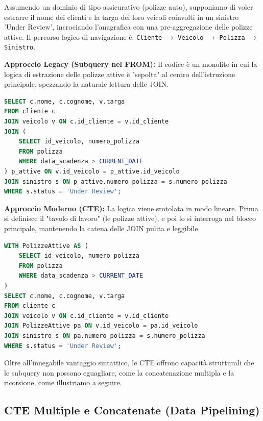 \begin{example}
Assumendo un dominio di tipo assicurativo (polizze auto), supponiamo di voler estrarre il nome dei clienti e la targa dei loro veicoli coinvolti in un sinistro 'Under Review', incrociando l'anagrafica con una pre-aggregazione delle polizze attive.
Il percorso logico di navigazione è: \texttt{Cliente} $\rightarrow$ \texttt{Veicolo} $\rightarrow$ \texttt{Polizza} $\rightarrow$ \texttt{Sinistro}.

\textbf{Approccio Legacy (Subquery nel FROM):}
Il codice è un monolite in cui la logica di estrazione delle polizze attive è "sepolta" al centro dell'istruzione principale, spezzando la naturale lettura delle JOIN.
\begin{lstlisting}[language=SQL, basicstyle=\ttfamily\small, keywordstyle=\color{blue}\bfseries]
SELECT c.nome, c.cognome, v.targa
FROM cliente c
JOIN veicolo v ON c.id_cliente = v.id_cliente
JOIN (
    SELECT id_veicolo, numero_polizza
    FROM polizza
    WHERE data_scadenza > CURRENT_DATE
) p_attive ON v.id_veicolo = p_attive.id_veicolo
JOIN sinistro s ON p_attive.numero_polizza = s.numero_polizza
WHERE s.status = 'Under Review';
\end{lstlisting}

\textbf{Approccio Moderno (CTE):}
La logica viene srotolata in modo lineare. Prima si definisce il "tavolo di lavoro" (le polizze attive), e poi lo si interroga nel blocco principale, mantenendo la catena delle JOIN pulita e leggibile.
\begin{lstlisting}[language=SQL, basicstyle=\ttfamily\small, keywordstyle=\color{blue}\bfseries]
WITH PolizzeAttive AS (
    SELECT id_veicolo, numero_polizza
    FROM polizza
    WHERE data_scadenza > CURRENT_DATE
)
SELECT c.nome, c.cognome, v.targa
FROM cliente c
JOIN veicolo v ON c.id_cliente = v.id_cliente
JOIN PolizzeAttive pa ON v.id_veicolo = pa.id_veicolo
JOIN sinistro s ON pa.numero_polizza = s.numero_polizza
WHERE s.status = 'Under Review';
\end{lstlisting}
\end{example}

Oltre all'innegabile vantaggio sintattico, le CTE offrono capacità strutturali che le subquery non possono eguagliare, come la concatenazione multipla e la ricorsione, come illustriamo a seguire. 

\subsection{CTE Multiple e Concatenate (Data Pipelining)}

